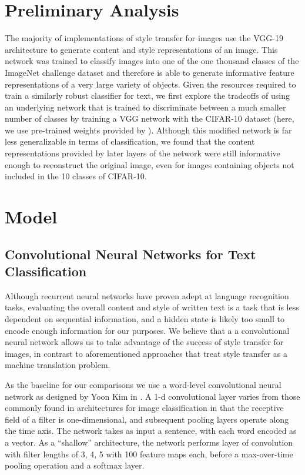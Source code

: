 \documentclass{vldb}
\begin{document}
\section{Preliminary Analysis}
The majority of implementations of style transfer for images use the VGG-19 \cite{VGG19} architecture to generate content and style representations of an image. This network was trained to classify images into one of the one thousand classes of the ImageNet challenge dataset \cite{ILSVRC15} and therefore is able to generate informative feature representations of a very large variety of objects. Given the resources required to train a similarly robust classifier for text, we first explore the tradeoffs of using an underlying network that is trained to discriminate between a much smaller number of classes by training a VGG network with the CIFAR-10 dataset \cite{Krizhevsky09} (here, we use pre-trained weights provided by \cite{Liu15}). Although this modified network is far less generalizable in terms of classification, we found that the content representations provided by later layers of the network were still informative enough to reconstruct the original image, even for images containing objects not included in the 10 classes of CIFAR-10. 

\section{Model}
\subsection{Convolutional Neural Networks for Text Classification}
Although recurrent neural networks have proven adept at language recognition tasks, evaluating the overall content and style of written text is a task that is less dependent on sequential information, and a hidden state is likely too small to encode enough information for our purposes. We believe that a a convolutional neural network allows us to take advantage of the success of style transfer for images, in contrast to aforementioned approaches that treat style transfer as a machine translation problem.

As the baseline for our comparisons we use a word-level convolutional neural network as designed by Yoon Kim in \cite{Kim14f}. A 1-d convolutional layer varies from those commonly found in architectures for image classification in that the receptive field of a filter is one-dimensional, and subsequent pooling layers operate along the time axis. The network takes as input a sentence, with each word encoded as a vector. As a ``shallow'' architecture, the network performs layer of convolution with filter lengths of 3, 4, 5 with 100 feature maps each, before a max-over-time pooling operation and a softmax layer. 
\end{document}
